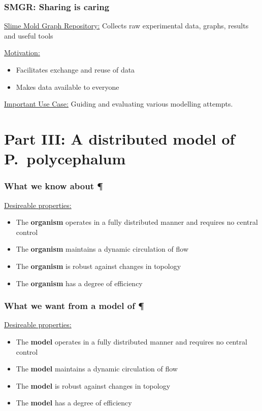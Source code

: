 \documentclass[	hyperref={pdfpagelabels=false}, xcolor=dvipsnames,
		11pt]{beamer}
\begin{document}
\begin{frame}
    \frametitle{SMGR: Sharing is caring} 

    \begin{block}{\underline{Slime Mold Graph Repository:}}
    	Collects raw experimental data, graphs, results and useful tools
    \end{block}

	\begin{block}{\underline{Motivation:}}
	 \begin{itemize}
		   \item Facilitates exchange and reuse of data
		   \item Makes data available to everyone
	 \end{itemize}
	\end{block}

	\underline{Important Use Case:} Guiding and evaluating various modelling attempts.
\end{frame}

\section{Part III: A distributed model of P.~polycephalum} 

\begin{frame}
    \frametitle{What we know about \P} 

	\begin{block}{\underline{Desireable properties:}}
	 \begin{itemize}
	 	\item The \textbf{organism} operates in a fully distributed manner and requires no central control
		\item The \textbf{organism} maintains a dynamic circulation of flow
		\item The \textbf{organism} is robust against changes in topology
		\item The \textbf{organism} has a degree of efficiency
	 \end{itemize}
	\end{block}
\end{frame}

\begin{frame}
    \frametitle{What we want from a model of \P} 

	\begin{block}{\underline{Desireable properties:}}
	 \begin{itemize}
	 	\item The \textbf{model} operates in a fully distributed manner and requires no central control
		\item The \textbf{model} maintains a dynamic circulation of flow
		\item The \textbf{model} is robust against changes in topology
		\item The \textbf{model} has a degree of efficiency
	 \end{itemize}
	\end{block}
\end{frame}
\end{document}

